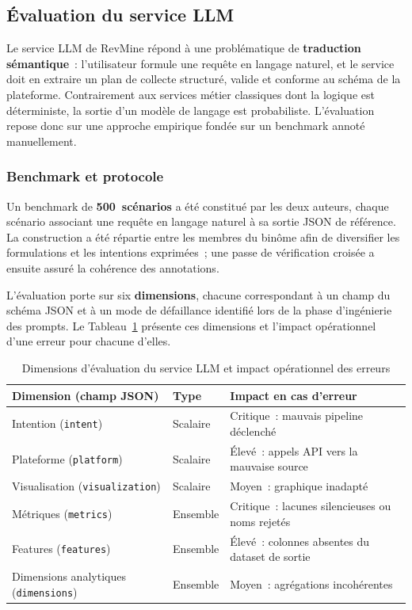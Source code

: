 \subsection{Évaluation du service LLM}
\label{sec:eval_llm}

Le service LLM de RevMine répond à une problématique de \textbf{traduction sémantique}~:
l'utilisateur formule une requête en langage naturel, et le service doit en extraire un plan de
collecte structuré, valide et conforme au schéma de la plateforme. Contrairement aux services
métier classiques dont la logique est déterministe, la sortie d'un modèle de langage est
probabiliste. L'évaluation repose donc sur une approche empirique fondée sur un benchmark
annoté manuellement.

\subsubsection*{Benchmark et protocole}

Un benchmark de \textbf{500~scénarios} a été constitué par les deux auteurs, chaque scénario
associant une requête en langage naturel à sa sortie JSON de référence. La construction a été
répartie entre les membres du binôme afin de diversifier les formulations et les intentions
exprimées~; une passe de vérification croisée a ensuite assuré la cohérence des annotations.

L'évaluation porte sur six \textbf{dimensions}, chacune correspondant à un champ du schéma JSON
et à un mode de défaillance identifié lors de la phase d'ingénierie des prompts. Le
Tableau~\ref{tab:eval_dim_fr} présente ces dimensions et l'impact opérationnel d'une erreur
pour chacune d'elles.

\begin{table}[H]
\centering
\small
\caption{Dimensions d'évaluation du service LLM et impact opérationnel des erreurs}
\label{tab:eval_dim_fr}
\begin{tabular}{|>{\raggedright\arraybackslash}p{3.5cm}
                |>{\centering\arraybackslash}p{1.8cm}
                |>{\raggedright\arraybackslash}p{7cm}|}
\hline
\textbf{Dimension (champ JSON)} & \textbf{Type} & \textbf{Impact en cas d'erreur} \\
\hline
Intention (\texttt{intent}) & Scalaire & Critique~: mauvais pipeline déclenché \\
\hline
Plateforme (\texttt{platform}) & Scalaire & Élevé~: appels API vers la mauvaise source \\
\hline
Visualisation (\texttt{visualization}) & Scalaire & Moyen~: graphique inadapté \\
\hline
Métriques (\texttt{metrics}) & Ensemble & Critique~: lacunes silencieuses ou noms rejetés \\
\hline
Features (\texttt{features}) & Ensemble & Élevé~: colonnes absentes du dataset de sortie \\
\hline
Dimensions analytiques (\texttt{dimensions}) & Ensemble & Moyen~: agrégations incohérentes \\
\hline
\end{tabular}
\end{table}

